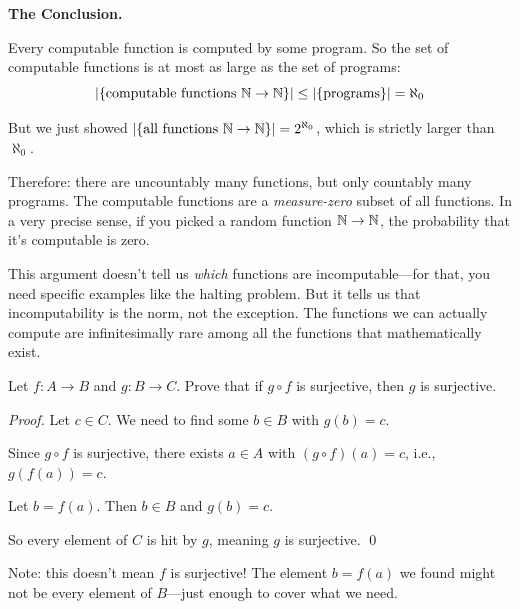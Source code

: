 \begin{keyresult}
\textbf{The Conclusion.}

Every computable function is computed by some program. So the set of computable functions is at most as large as the set of programs:
\[
|\{\text{computable functions } \mathbb{N} \to \mathbb{N}\}| \leq |\{\text{programs}\}| = \aleph_0
\]

But we just showed $|\{\text{all functions } \mathbb{N} \to \mathbb{N}\}| = 2^{\aleph_0}$, which is strictly larger than $\aleph_0$.

Therefore: there are uncountably many functions, but only countably many programs. The computable functions are a \emph{measure-zero} subset of all functions. In a very precise sense, if you picked a random function $\mathbb{N} \to \mathbb{N}$, the probability that it's computable is zero.

This argument doesn't tell us \emph{which} functions are incomputable---for that, you need specific examples like the halting problem. But it tells us that incomputability is the norm, not the exception. The functions we can actually compute are infinitesimally rare among all the functions that mathematically exist.
\end{keyresult}

\begin{example}
Let $f: A \to B$ and $g: B \to C$. Prove that if $g \circ f$ is surjective, then $g$ is surjective.

\emph{Proof.} Let $c \in C$. We need to find some $b \in B$ with $g(b) = c$.

Since $g \circ f$ is surjective, there exists $a \in A$ with $(g \circ f)(a) = c$, i.e., $g(f(a)) = c$.

Let $b = f(a)$. Then $b \in B$ and $g(b) = c$.

So every element of $C$ is hit by $g$, meaning $g$ is surjective. \qed

Note: this doesn't mean $f$ is surjective! The element $b = f(a)$ we found might not be every element of $B$---just enough to cover what we need.
\end{example}

